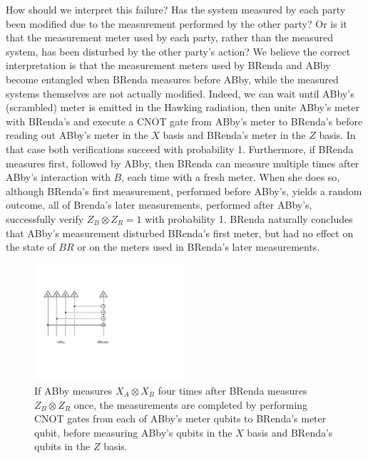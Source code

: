 \documentclass[11pt]{article}
\begin{document}
How should we interpret this failure? Has the system measured by each party been modified due to the measurement performed by the other party? Or is it that the measurement meter used by each party, rather than the measured system, has been disturbed by the other party's action? We believe the correct interpretation is that the measurement meters used by BRenda and ABby become entangled when BRenda measures before ABby, while the measured systems themselves are not actually modified. Indeed, we can wait until ABby's (scrambled) meter is emitted in the Hawking radiation, then unite ABby's meter with BRenda's and execute a CNOT gate from ABby's meter to BRenda's before reading out ABby's meter in the $X$ basis and BRenda's meter in the $Z$ basis. In that case both verifications succeed with probability 1. Furthermore, if BRenda measures first, followed by ABby, then BRenda can measure multiple times after ABby's interaction with $B$, each time with a fresh meter. When she does so, although BRenda's first measurement, performed before ABby's, yields a random outcome, all of Brenda's later measurements, performed after ABby's, successfully verify $Z_B\otimes Z_R = 1$ with probability 1. BRenda naturally concludes that ABby's measurement disturbed BRenda's first meter, but had no effect on the state of $BR$ or on the meters used in BRenda's later measurements. 


\begin{figure}[t]
\begin{center}
\includegraphics[width=0.5\textwidth]{decode-ghz.pdf}
\end{center}
\caption{If ABby measures $X_A\otimes X_B$ four times after BRenda measures $Z_B\otimes Z_R$ once, the measurements are completed by performing CNOT gates from each of ABby's meter qubits to BRenda's meter qubit, before measuring ABby's qubits in the $X$ basis and BRenda's qubits in the $Z$ basis.}
\label{fig:decode-ghz}
\end{figure}
\end{document}
